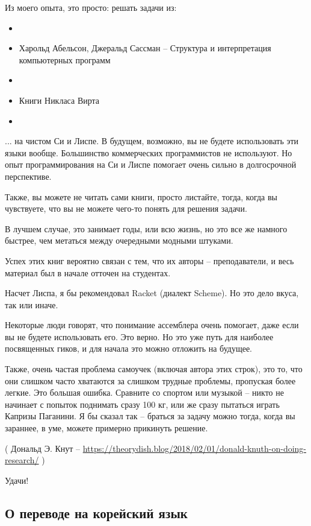 Из моего опыта, это просто: решать задачи из:

\begin{itemize}
\item \KRBook
\item Харольд Абельсон, Джеральд Сассман -- Структура и интерпретация компьютерных программ
\item \TAOCP
\item Книги Никласа Вирта
\item \RobPikePractice
\end{itemize}

... на чистом Си и Лиспе.
В будущем, возможно, вы не будете использовать эти языки вообще.
Большинство коммерческих программистов не используют. Но опыт программирования на Си и Лиспе помогает очень сильно в 
долгосрочной перспективе.

Также, вы можете не читать сами книги, просто листайте, тогда, когда вы чувствуете, что вы не можете чего-то
понять для решения задачи.

В лучшем случае, это занимает годы, или всю жизнь, но это все же намного быстрее, чем метаться между очередными модными
штуками.

Успех этих книг вероятно связан с тем, что их авторы -- преподаватели, и весь материал был в начале отточен на студентах.

Насчет Лиспа, я бы рекомендовал Racket (диалект Scheme). Но это дело вкуса, так или иначе.

Некоторые люди говорят, что понимание ассемблера очень помогает, даже если вы не будете использовать его.
Это верно.
Но это уже путь для наиболее посвященных гиков, и для начала это можно отложить на будущее.

Также, очень частая проблема самоучек (включая автора этих строк), это то, что они слишком часто хватаются
за слишком трудные проблемы, пропуская более легкие.
Это большая ошибка.
Сравните со спортом или музыкой -- никто не начинает с попыток поднимать сразу 100 кг,
или же сразу пытаться играть Капризы Паганини.
Я бы сказал так -- браться за задачу можно тогда, когда вы зараннее, в уме, можете примерно прикинуть решение.


( Дональд Э. Кнут -- \url{https://theorydish.blog/2018/02/01/donald-knuth-on-doing-research/} )

Удачи!

\subsection*{О переводе на корейский язык}

